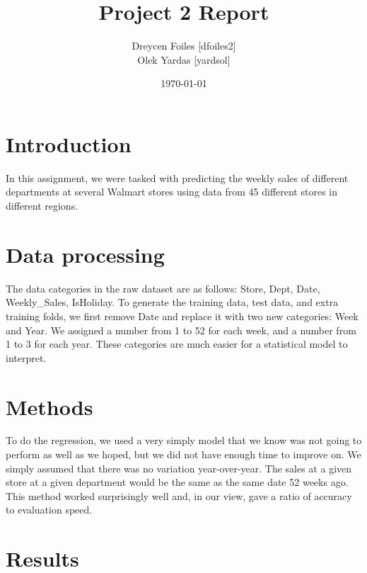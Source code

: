 \documentclass{article}
\title{Project 2 Report}
\author{Dreycen Foiles [dfoiles2] \\ Olek Yardas [yardsol]}
\date{\today}
\begin{document}
\maketitle

\section{Introduction}
In this assignment, we were tasked with predicting the weekly sales of
different departments at several Walmart stores using data from 45 different
stores in different regions.

\section{Data processing}
The data categories in the raw dataset are as follows: Store, Dept, Date,
Weekly\_Sales, IsHoliday. To generate the training data, test data, and extra
training folds, we first remove Date and replace it with two new categories:
Week and Year. We assigned a number from 1 to 52 for each week, and a number
from 1 to 3 for each year. These categories are much easier for a statistical model to interpret.

\section{Methods}
To do the regression, we used a very simply model that we know was not going to perform as well as we hoped, but we did not have enough time to improve on. We simply assumed that there was no variation year-over-year. The sales at a given store at a given department would be the same as the same date 52 weeks ago. This method worked surprisingly well and, in our view, gave a ratio of accuracy to evaluation speed. 

\section{Results}
\end{document}
